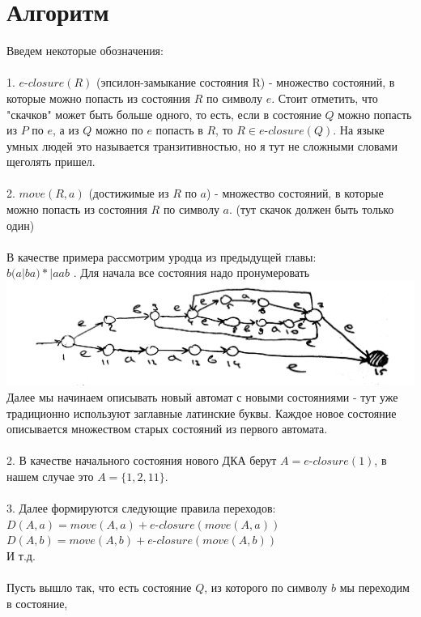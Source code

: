 \documentclass[14pt]{extreport}
\begin{document}
	\section{Алгоритм}
	Введем некоторые обозначения:\\\\
	1. $e$-$closure(R)$ (эпсилон-замыкание состояния R) - множество состояний, в которые можно
	попасть из состояния $R$ по символу $e$. Стоит отметить, что "скачков"
	может быть больше одного,
	то есть, если в состояние $Q$ можно попасть из $P$ по $e$, а из $Q$ можно по $e$ попасть в $R$,
	то $R \in e$-$closure(Q)$. На языке умных людей это называется транзитивностью, но я тут не
	сложными словами щеголять пришел.\\\\
	2. $move(R, a)$ (достижимые из $R$ по $a$) - множество состояний, в которые можно попасть из
	состояния $R$ по символу $a$. (тут скачок должен быть только один)\\\\
	В качестве примера рассмотрим уродца из предыдущей главы:\\ $b(a|ba)*|aab$
	. Для начала все состояния надо пронумеровать\\
	\includegraphics[scale=0.13]{data/pic2_1.png}\\
	Далее мы начинаем описывать новый автомат с новыми состояниями - тут уже традиционно
	используют заглавные латинские буквы. Каждое новое состояние описывается множеством 
	старых состояний из первого автомата.\\\\
	2. В качестве начального состояния нового ДКА берут $A=e$-$closure(1)$, в нашем случае
	это $A=\{1, 2, 11\}$.\\\\
	3. Далее формируются следующие правила переходов:\\
	$D(A, a) = move(A, a)+e$-$closure(move(A, a))$\\
	$D(A, b) = move(A, b)+e$-$closure(move(A, b))$\\
	И т.д.\\\\
	Пусть вышло так, что есть состояние $Q$, из которого по символу $b$ мы переходим в состояние,
\end{document}
